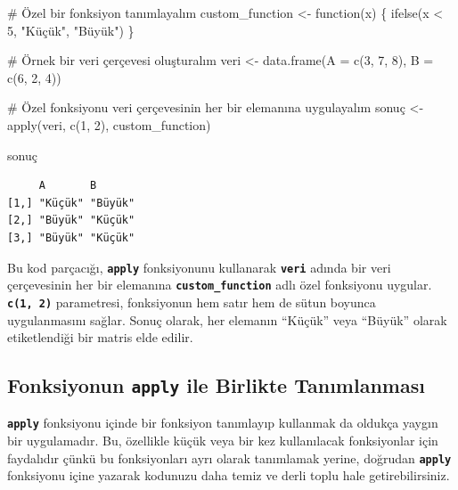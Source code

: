 \documentclass[
  letterpaper,
  DIV=11,
  numbers=noendperiod]{scrreprt}
\newenvironment{Shaded}{\begin{snugshade}}{\end{snugshade}}
\newcommand{\AttributeTok}[1]{\textcolor[rgb]{0.40,0.45,0.13}{#1}}
\newcommand{\CommentTok}[1]{\textcolor[rgb]{0.37,0.37,0.37}{#1}}
\newcommand{\ControlFlowTok}[1]{\textcolor[rgb]{0.00,0.23,0.31}{#1}}
\newcommand{\DecValTok}[1]{\textcolor[rgb]{0.68,0.00,0.00}{#1}}
\newcommand{\FunctionTok}[1]{\textcolor[rgb]{0.28,0.35,0.67}{#1}}
\newcommand{\NormalTok}[1]{\textcolor[rgb]{0.00,0.23,0.31}{#1}}
\newcommand{\OtherTok}[1]{\textcolor[rgb]{0.00,0.23,0.31}{#1}}
\newcommand{\SpecialCharTok}[1]{\textcolor[rgb]{0.37,0.37,0.37}{#1}}
\newcommand{\StringTok}[1]{\textcolor[rgb]{0.13,0.47,0.30}{#1}}
\begin{document}
\begin{Shaded}
\begin{Highlighting}[]
\CommentTok{\# Özel bir fonksiyon tanımlayalım}
\NormalTok{custom\_function }\OtherTok{\textless{}{-}} \ControlFlowTok{function}\NormalTok{(x) \{}
  \FunctionTok{ifelse}\NormalTok{(x }\SpecialCharTok{\textless{}} \DecValTok{5}\NormalTok{, }\StringTok{"Küçük"}\NormalTok{, }\StringTok{"Büyük"}\NormalTok{)}
\NormalTok{\}}

\CommentTok{\# Örnek bir veri çerçevesi oluşturalım}
\NormalTok{veri }\OtherTok{\textless{}{-}} \FunctionTok{data.frame}\NormalTok{(}\AttributeTok{A =} \FunctionTok{c}\NormalTok{(}\DecValTok{3}\NormalTok{, }\DecValTok{7}\NormalTok{, }\DecValTok{8}\NormalTok{), }\AttributeTok{B =} \FunctionTok{c}\NormalTok{(}\DecValTok{6}\NormalTok{, }\DecValTok{2}\NormalTok{, }\DecValTok{4}\NormalTok{))}

\CommentTok{\# Özel fonksiyonu veri çerçevesinin her bir elemanına uygulayalım}
\NormalTok{sonuç }\OtherTok{\textless{}{-}} \FunctionTok{apply}\NormalTok{(veri, }\FunctionTok{c}\NormalTok{(}\DecValTok{1}\NormalTok{, }\DecValTok{2}\NormalTok{), custom\_function)}

\NormalTok{sonuç}
\end{Highlighting}
\end{Shaded}

\begin{verbatim}
     A       B      
[1,] "Küçük" "Büyük"
[2,] "Büyük" "Küçük"
[3,] "Büyük" "Küçük"
\end{verbatim}

Bu kod parçacığı, \textbf{\texttt{apply}} fonksiyonunu kullanarak
\textbf{\texttt{veri}} adında bir veri çerçevesinin her bir elemanına
\textbf{\texttt{custom\_function}} adlı özel fonksiyonu uygular.
\textbf{\texttt{c(1,\ 2)}} parametresi, fonksiyonun hem satır hem de
sütun boyunca uygulanmasını sağlar. Sonuç olarak, her elemanın ``Küçük''
veya ``Büyük'' olarak etiketlendiği bir matris elde edilir.

\subsection{\texorpdfstring{Fonksiyonun \textbf{\texttt{apply}} ile
Birlikte
Tanımlanması}{Fonksiyonun apply ile Birlikte Tanımlanması}}\label{fonksiyonun-apply-ile-birlikte-tanux131mlanmasux131}

\textbf{\texttt{apply}} fonksiyonu içinde bir fonksiyon tanımlayıp
kullanmak da oldukça yaygın bir uygulamadır. Bu, özellikle küçük veya
bir kez kullanılacak fonksiyonlar için faydalıdır çünkü bu fonksiyonları
ayrı olarak tanımlamak yerine, doğrudan \textbf{\texttt{apply}}
fonksiyonu içine yazarak kodunuzu daha temiz ve derli toplu hale
getirebilirsiniz.
\end{document}
